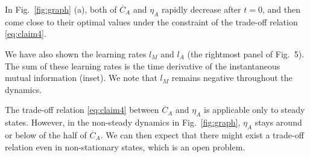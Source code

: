 \documentclass[%
 reprint,
 amsmath,amssymb,
 aps,
]{revtex4-1}
\newcommand{\fref}[1]{Fig.~\ref{fig:#1}}
\theoremstyle{plain}
\begin{document}
In \fref{graph} (a), both of $\overline{C}_A$ and $\eta_A$ rapidly decrease after $t=0$, and then come close to their optimal values under the constraint of the trade-off relation \eqref{eq:claim4}.

We have also shown the learning rates $l_M$ and $l_A$ (the rightmost panel of Fig.~5). The sum of these learning rates is the time derivative of the instantaneous mutual information (inset). We note that $l_M$ remains negative throughout the dynamics.

The trade-off relation \eqref{eq:claim4} between $\overline{C}_A$ and $\eta_A$ is applicable only to steady states.  However,  in the non-steady dynamics in Fig.~\ref{fig:graph}, $\eta_A$ stays around or below of the half of $\overline{C}_A$.  We can then expect that there might exist a trade-off relation even in non-stationary states, which is an open problem.


\end{document}
